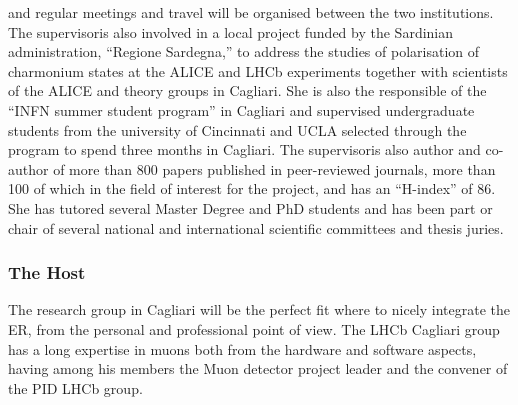 \documentclass[a4paper,11pt]{article}
\newcommand{\ER}{ER}
\newcommand{\Supervisor}{The supervisor}
\begin{document}
and regular meetings and travel will be organised between the two institutions.
\Supervisor is also involved in a local project funded by the 
Sardinian administration, ``Regione Sardegna,'' to address the studies of 
polarisation of charmonium states at the ALICE and LHCb experiments
together with scientists of the ALICE and theory groups in Cagliari.
She is also the responsible of the ``INFN summer student program'' in 
Cagliari and supervised undergraduate students from the university of Cincinnati 
and UCLA selected through the program to spend three
months in Cagliari.
\Supervisor is also author and co-author of more than 800 
papers published in peer-reviewed journals, more than 100 of which 
in the field of interest for the project, and has an ``H-index'' of 86.
She has tutored several Master Degree and PhD students and has
 been part or chair of several national
and international scientific committees and thesis juries.



\subsubsection{The Host}


The research group in Cagliari
will be the perfect fit where to nicely integrate the \ER, from the
personal and professional point of view. 
The LHCb Cagliari group has a long expertise in 
muons both from the hardware and software 
aspects, having among his members the Muon 
detector project leader and the convener of the 
PID LHCb group.
\end{document}
